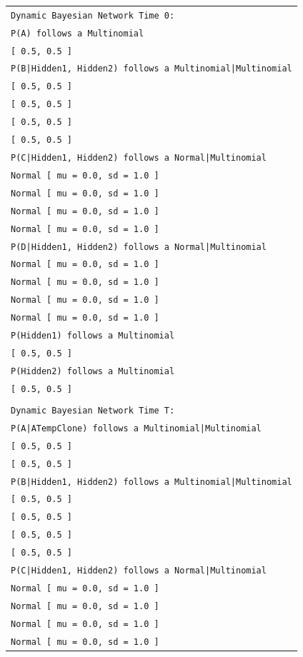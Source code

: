 \vspace{-0.1in}
\begin{table}[H]
\small{\begin{tabular}{l} \\

\texttt{Dynamic Bayesian Network Time 0:}\\
\texttt{P(A) follows a Multinomial}\\
\texttt{[ 0.5, 0.5 ]}\\
\texttt{P(B|Hidden1, Hidden2) follows a Multinomial|Multinomial}\\
\texttt{[ 0.5, 0.5 ]}\\
\texttt{[ 0.5, 0.5 ]}\\
\texttt{[ 0.5, 0.5 ]}\\
\texttt{[ 0.5, 0.5 ]}\\
\texttt{P(C|Hidden1, Hidden2) follows a Normal|Multinomial}\\
\texttt{Normal [ mu = 0.0, sd = 1.0 ]}\\
\texttt{Normal [ mu = 0.0, sd = 1.0 ]}\\
\texttt{Normal [ mu = 0.0, sd = 1.0 ]}\\
\texttt{Normal [ mu = 0.0, sd = 1.0 ]}\\

\texttt{P(D|Hidden1, Hidden2) follows a Normal|Multinomial}\\
\texttt{Normal [ mu = 0.0, sd = 1.0 ]}\\
\texttt{Normal [ mu = 0.0, sd = 1.0 ]}\\
\texttt{Normal [ mu = 0.0, sd = 1.0 ]}\\
\texttt{Normal [ mu = 0.0, sd = 1.0 ]}\\

\texttt{P(Hidden1) follows a Multinomial}\\
\texttt{[ 0.5, 0.5 ]}\\

\texttt{P(Hidden2) follows a Multinomial}\\
\texttt{[ 0.5, 0.5 ]}\\\\

\texttt{Dynamic Bayesian Network Time T:}\\
\texttt{P(A|ATempClone) follows a Multinomial|Multinomial}\\
\texttt{[ 0.5, 0.5 ]}\\
\texttt{[ 0.5, 0.5 ]}\\
\texttt{P(B|Hidden1, Hidden2) follows a Multinomial|Multinomial}\\
\texttt{[ 0.5, 0.5 ]}\\
\texttt{[ 0.5, 0.5 ]}\\
\texttt{[ 0.5, 0.5 ]}\\
\texttt{[ 0.5, 0.5 ]}\\
\texttt{P(C|Hidden1, Hidden2) follows a Normal|Multinomial}\\
\texttt{Normal [ mu = 0.0, sd = 1.0 ]}\\
\texttt{Normal [ mu = 0.0, sd = 1.0 ]}\\
\texttt{Normal [ mu = 0.0, sd = 1.0 ]}\\
\texttt{Normal [ mu = 0.0, sd = 1.0 ]}\\


\end{tabular}}
\end{table}
